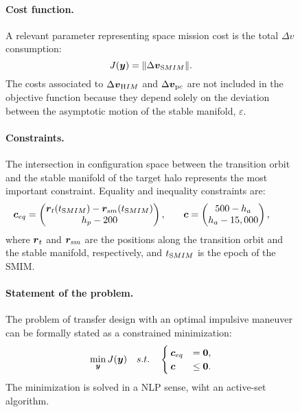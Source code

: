 \begin{figure*}[b!]
\paragraph{Cost function.} A relevant parameter representing space mission cost is the total $\Delta v$ consumption:
%
\begin{equation}
J(\boldsymbol{y}) = \|\Delta\boldsymbol{v}_{\textrm SMIM}\|.
\end{equation}
%
The costs associated to $\Delta\boldsymbol{v}_{\textrm HIM}$ and $\Delta\boldsymbol{v}_{\textrm pc}$ are not included in the objective function because they depend solely on the deviation between the asymptotic motion of the stable manifold, \ie $\varepsilon$.

\paragraph{Constraints.} 
The intersection in configuration space between the transition orbit and the stable manifold of the target halo represents the most important constraint. Equality and inequality constraints are:
%
\begin{align}
&\begin{aligned}
\boldsymbol{c}_{eq} &= \begin{pmatrix}
\boldsymbol{r}_t(t_{\textrm SMIM})-\boldsymbol{r}_{\textrm sm}(t_{\textrm SMIM}) \\
h_p-200
\end{pmatrix},
\end{aligned}
&
&\begin{aligned}
\boldsymbol{c} &= \begin{pmatrix}
500-h_a \\
h_a-15,000
\end{pmatrix},
\end{aligned}
\end{align}
%
where $\boldsymbol{r}_t$ and $\boldsymbol{r}_{\textrm sm}$ are the positions along the transition orbit and the stable manifold, respectively, and $t_{\textrm SMIM}$ is the epoch of the {SMIM}.
%
\paragraph{Statement of the problem.}
	The problem of transfer design with an optimal impulsive maneuver can be formally stated as a constrained minimization:
	\begin{align}\label{pb:minimizaionTransferDesign}
	\min_{\boldsymbol{y}}{J(\boldsymbol{y})}\quad s.t. \quad
	\begin{cases}
	\boldsymbol{c}_{eq} &= \boldsymbol{0}, \\
	\boldsymbol{c} &\le \boldsymbol{0}.
	\end{cases}
	\end{align}
	The minimization is solved in a {NLP} sense, wiht an active-set algorithm.



\end{figure*}
